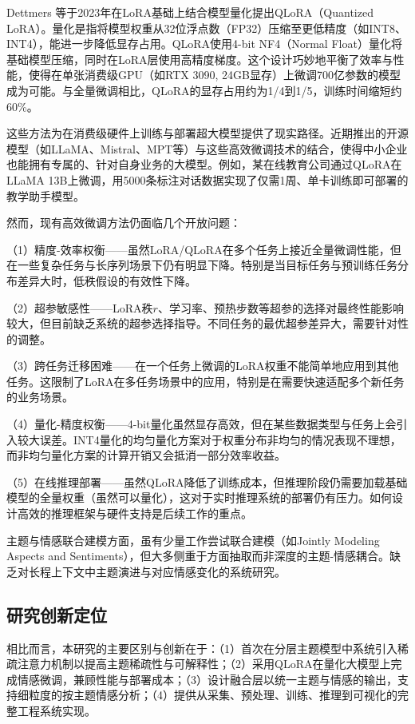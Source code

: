 Dettmers 等于2023年在LoRA基础上结合模型量化提出QLoRA（Quantized LoRA）。量化是指将模型权重从32位浮点数（FP32）压缩至更低精度（如INT8、INT4），能进一步降低显存占用。QLoRA使用4-bit NF4（Normal Float）量化将基础模型压缩，同时在LoRA层使用高精度梯度。这个设计巧妙地平衡了效率与性能，使得在单张消费级GPU（如RTX 3090, 24GB显存）上微调700亿参数的模型成为可能。与全量微调相比，QLoRA的显存占用约为1/4到1/5，训练时间缩短约60\%。

这些方法为在消费级硬件上训练与部署超大模型提供了现实路径。近期推出的开源模型（如LLaMA、Mistral、MPT等）与这些高效微调技术的结合，使得中小企业也能拥有专属的、针对自身业务的大模型。例如，某在线教育公司通过QLoRA在LLaMA 13B上微调，用5000条标注对话数据实现了仅需1周、单卡训练即可部署的教学助手模型。

然而，现有高效微调方法仍面临几个开放问题：

（1）精度-效率权衡——虽然LoRA/QLoRA在多个任务上接近全量微调性能，但在一些复杂任务与长序列场景下仍有明显下降。特别是当目标任务与预训练任务分布差异大时，低秩假设的有效性下降。

（2）超参敏感性——LoRA秩$r$、学习率、预热步数等超参的选择对最终性能影响较大，但目前缺乏系统的超参选择指导。不同任务的最优超参差异大，需要针对性的调整。

（3）跨任务迁移困难——在一个任务上微调的LoRA权重不能简单地应用到其他任务。这限制了LoRA在多任务场景中的应用，特别是在需要快速适配多个新任务的业务场景。

（4）量化-精度权衡——4-bit量化虽然显存高效，但在某些数据类型与任务上会引入较大误差。INT4量化的均匀量化方案对于权重分布非均匀的情况表现不理想，而非均匀量化方案的计算开销又会抵消一部分效率收益。

（5）在线推理部署——虽然QLoRA降低了训练成本，但推理阶段仍需要加载基础模型的全量权重（虽然可以量化），这对于实时推理系统的部署仍有压力。如何设计高效的推理框架与硬件支持是后续工作的重点。

主题与情感联合建模方面，虽有少量工作尝试联合建模（如Jointly Modeling Aspects and Sentiments），但大多侧重于方面抽取而非深度的主题-情感耦合。缺乏对长程上下文中主题演进与对应情感变化的系统研究。

\subsection{研究创新定位}
相比而言，本研究的主要区别与创新在于：（1）首次在分层主题模型中系统引入稀疏注意力机制以提高主题稀疏性与可解释性；（2）采用QLoRA在量化大模型上完成情感微调，兼顾性能与部署成本；（3）设计融合层以统一主题与情感的输出，支持细粒度的按主题情感分析；（4）提供从采集、预处理、训练、推理到可视化的完整工程系统实现。

